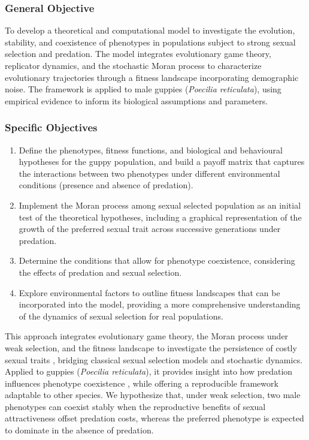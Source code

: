 \subsubsection{General Objective}

To develop a theoretical and computational model to investigate the evolution, stability, and coexistence of phenotypes in populations subject to strong sexual selection and predation. The model integrates evolutionary game theory, replicator dynamics, and the stochastic Moran process to characterize evolutionary trajectories through a fitness landscape incorporating demographic noise. The framework is applied to male guppies (\textit{Poecilia reticulata}), using empirical evidence to inform its biological assumptions and parameters.

\subsubsection{Specific Objectives}
\begin{enumerate}
    \item Define the phenotypes, fitness functions, and biological and behavioural hypotheses for the guppy population, and build a payoff matrix that captures the interactions between two phenotypes under different environmental conditions (presence and absence of predation).
    
    \item  Implement the Moran process among sexual selected population as an initial test of the theoretical hypotheses, including a graphical representation of the growth of the preferred sexual trait across successive generations under predation.
    
    \item Determine the conditions that allow for phenotype coexistence, considering the effects of predation and sexual selection.
    
    \item  Explore environmental factors to outline fitness landscapes that can be incorporated into the model, providing a more comprehensive understanding of the dynamics of sexual selection for real populations.
\end{enumerate}


This approach integrates evolutionary game theory, the Moran process under weak selection, and the fitness landscape to investigate the persistence of costly sexual traits \cite{nowakEvolutionaryDynamicsExploring2006,andersson1994}, bridging classical sexual selection models and stochastic dynamics. Applied to guppies (\textit{Poecilia reticulata}), it provides insight into how predation influences phenotype coexistence \cite{houdeMATECHOICEBASED1987,magnhagen1991,houdeSexColorMate1997,endlerNATURALSELECTIONCOLOR1980}, while offering a reproducible framework adaptable to other species. We hypothesize that, under weak selection, two male phenotypes can coexist stably when the reproductive benefits of sexual attractiveness offset predation costs, whereas the preferred phenotype is expected to dominate in the absence of predation.\\


